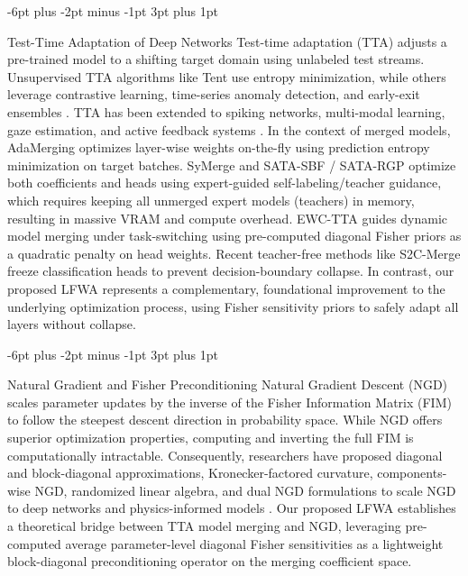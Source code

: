 \documentclass{article}
\makeatletter
\theoremstyle{plain}
\theoremstyle{definition}
\theoremstyle{remark}
\renewcommand{\subsection}{\@startsection{subsection}{2}{\z@}%
                          {-6pt plus -2pt minus -1pt}%
                          {3pt plus 1pt}%
                          {\normalfont\normalsize\bfseries\raggedright}}
\makeatother
\begin{document}
\subsection{Test-Time Adaptation of Deep Networks}
Test-time adaptation (TTA) adjusts a pre-trained model to a shifting target domain using unlabeled test streams. Unsupervised TTA algorithms like Tent \cite{chen2022contrastive} use entropy minimization, while others leverage contrastive learning, time-series anomaly detection, and early-exit ensembles \cite{chen2022contrastive,kim2023when,jia2024tinytta}. TTA has been extended to spiking networks, multi-modal learning, gaze estimation, and active feedback systems \cite{zhao2025threshold,lei2025two-level,yin2025test-time,yeo2023rapid,gui2024active,huang2022extrapolative,bhardwaj2022benchmarking,zhang2024unsupervised,zhang2025scap}. In the context of merged models, AdaMerging \cite{yang2023adamerging} optimizes layer-wise weights on-the-fly using prediction entropy minimization on target batches. SyMerge \cite{jung2025symerge} and SATA-SBF / SATA-RGP \cite{submission1} optimize both coefficients and heads using expert-guided self-labeling/teacher guidance, which requires keeping all unmerged expert models (teachers) in memory, resulting in massive VRAM and compute overhead. EWC-TTA \cite{submission7} guides dynamic model merging under task-switching using pre-computed diagonal Fisher priors as a quadratic penalty on head weights. Recent teacher-free methods like S2C-Merge \cite{submission5} freeze classification heads to prevent decision-boundary collapse. In contrast, our proposed LFWA represents a complementary, foundational improvement to the underlying optimization process, using Fisher sensitivity priors to safely adapt all layers without collapse.

\subsection{Natural Gradient and Fisher Preconditioning}
Natural Gradient Descent (NGD) \cite{amari1998natural} scales parameter updates by the inverse of the Fisher Information Matrix (FIM) to follow the steepest descent direction in probability space. While NGD offers superior optimization properties, computing and inverting the full FIM is computationally intractable. Consequently, researchers have proposed diagonal and block-diagonal approximations, Kronecker-factored curvature, components-wise NGD, randomized linear algebra, and dual NGD formulations to scale NGD to deep networks and physics-informed models \cite{rudner2019natural,liu2024reconstructing,bioli2025accelerating,bao2025projected,abdulkadirov2023solving,sang2022component-wise,jnini2025dual,jnini2024gauss-newton}. Our proposed LFWA establishes a theoretical bridge between TTA model merging and NGD, leveraging pre-computed average parameter-level diagonal Fisher sensitivities as a lightweight block-diagonal preconditioning operator on the merging coefficient space.
\end{document}
